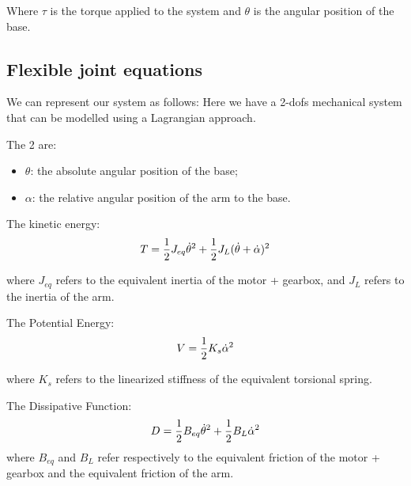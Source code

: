             Where $\tau$ is the torque applied to the system and $\theta$ is the angular position of the base.

        \subsection{Flexible joint equations}

            We can represent our system as follows:
            Here we have a 2-dofs mechanical system that can be modelled using a Lagrangian approach.

            \bigbreak

            The 2 \dofs are:
            \begin{itemize}
                \item $\theta$: the absolute angular position of the base;
                \item $\alpha$: the relative angular position of the arm \wrt to the base.
            \end{itemize}

            \bigbreak

            The kinetic energy:
            \[
                T = \frac{1}{2} J_{eq} \dot{\theta} ^2 + \frac{1}{2} J_{L} (\dot{\theta} + \dot{\alpha}) ^2 
            \]

            where $J_{eq}$ refers to the equivalent inertia of the motor + gearbox, and $J_{L}$ refers to the inertia of the arm.

            \bigbreak 

            The Potential Energy:
            \[
                V = \frac{1}{2} K_s \dot{\alpha}^2
            \]

            where $K_s$ refers to the linearized stiffness of the equivalent torsional spring.
            
            \bigbreak

            The Dissipative Function:
            \[
                D = \frac{1}{2} B_{eq} \dot{\theta}^2 + \frac{1}{2} B_{L} \dot{\alpha}^2\]
            where $B_{eq}$ and $B_L$ refer respectively to the equivalent friction of the motor + gearbox and the equivalent friction of the arm.
            
